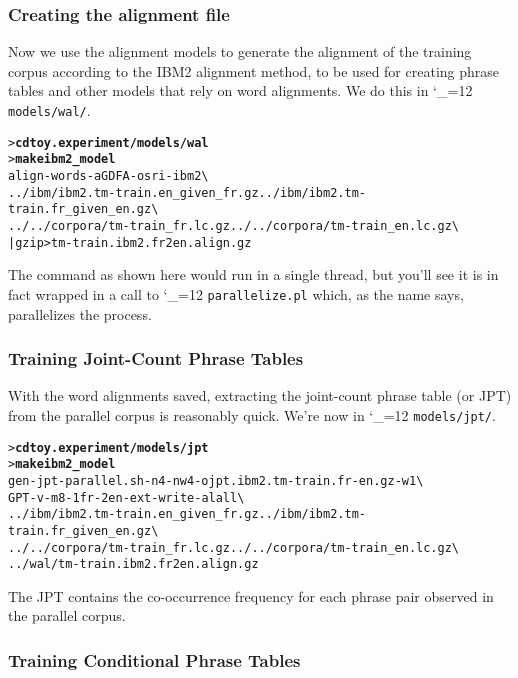 \documentclass[11pt,letterpaper]{article}
\newcommand{\bs}{\textbackslash{}}
\def\code{\begingroup\catcode`\_=12 \codex}
\newcommand{\codex}[1]{\texttt{#1}\endgroup}
\begin{document}
\subsubsection*{Creating the alignment file}

Now we use the alignment models to generate the alignment of the
training corpus according to the IBM2 alignment method, to be used for creating
phrase tables and other models that rely on word alignments.
We do this in \code{models/wal/}.

\begin{small}
\begin{alltt}
   > \textbf{cd toy.experiment/models/wal}
   > \textbf{make ibm2_model}
   align-words -a GDFA -o sri -ibm 2 \bs
      ../ibm/ibm2.tm-train.en_given_fr.gz ../ibm/ibm2.tm-train.fr_given_en.gz \bs
      ../../corpora/tm-train_fr.lc.gz ../../corpora/tm-train_en.lc.gz \bs
      | gzip > tm-train.ibm2.fr2en.align.gz
\end{alltt}
\end{small}

The command as shown here would run in a single thread, but you'll see it is in
fact wrapped in a call to \code{parallelize.pl} which, as the name says,
parallelizes the process.

\subsubsection*{Training Joint-Count Phrase Tables}

With the word alignments saved, extracting the joint-count phrase table (or JPT) from
the parallel corpus is reasonably quick. We're now in \code{models/jpt/}.
\begin{small}
\begin{alltt}
   > \textbf{cd toy.experiment/models/jpt}
   > \textbf{make ibm2_model}
   gen-jpt-parallel.sh -n 4 -nw 4 -o jpt.ibm2.tm-train.fr-en.gz -w 1 \bs
      GPT -v -m 8 -1 fr -2 en -ext -write-al all \bs
      ../ibm/ibm2.tm-train.en_given_fr.gz ../ibm/ibm2.tm-train.fr_given_en.gz \bs
      ../../corpora/tm-train_fr.lc.gz ../../corpora/tm-train_en.lc.gz \bs
      ../wal/tm-train.ibm2.fr2en.align.gz
\end{alltt}
\end{small}
The JPT contains the co-occurrence frequency for each phrase pair observed in
the parallel corpus.

\subsubsection*{Training Conditional Phrase Tables}
\end{document}

